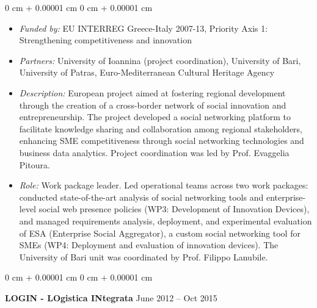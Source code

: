 \documentclass[10pt, a4paper]{article}
\newenvironment{highlights}{
    \begin{itemize}[
        topsep=0.10 cm,
        parsep=0.10 cm,
        partopsep=0pt,
        itemsep=0pt,
        leftmargin=0 cm + 10pt
    ]
}{
    \end{itemize}
} %
\newenvironment{onecolentry}{
    \begin{adjustwidth}{
        0 cm + 0.00001 cm
    }{
        0 cm + 0.00001 cm
    }
}{
    \end{adjustwidth}
} %
\newenvironment{twocolentry}[2][]{
    \onecolentry
    \def\secondColumn{#2}
    \setcolumnwidth{\fill, 4.5 cm}
    \begin{paracol}{2}
}{
    \switchcolumn \raggedleft \secondColumn
    \end{paracol}
    \endonecolentry
} %
\begin{document}
        \vspace{0.10 cm}
        \begin{onecolentry}
            \begin{highlights}
                \item \textit{Funded by:} EU INTERREG Greece-Italy 2007-13, Priority Axis 1: Strengthening competitiveness and innovation
                \item \textit{Partners:} University of Ioannina (project coordination), University of Bari, University of Patras, Euro-Mediterranean Cultural Heritage Agency
                \item \textit{Description:} European project aimed at fostering regional development through the creation of a cross-border network of social innovation and entrepreneurship. The project developed a social networking platform to facilitate knowledge sharing and collaboration among regional stakeholders, enhancing SME competitiveness through social networking technologies and business data analytics. Project coordination was led by Prof. Evaggelia Pitoura.
                \item \textit{Role:} Work package leader. Led operational teams across two work packages: conducted state-of-the-art analysis of social networking tools and enterprise-level social web presence policies (WP3: Development of Innovation Devices), and managed requirements analysis, deployment, and experimental evaluation of ESA (Enterprise Social Aggregator), a custom social networking tool for SMEs (WP4: Deployment and evaluation of innovation devices). The University of Bari unit was coordinated by Prof. Filippo Lanubile.
            \end{highlights}
        \end{onecolentry}


        \vspace{0.2 cm}

        \begin{twocolentry}{
            June 2012 – Oct 2015
        }
            \textbf{LOGIN - LOgistica INtegrata}\end{twocolentry}
\end{document}
